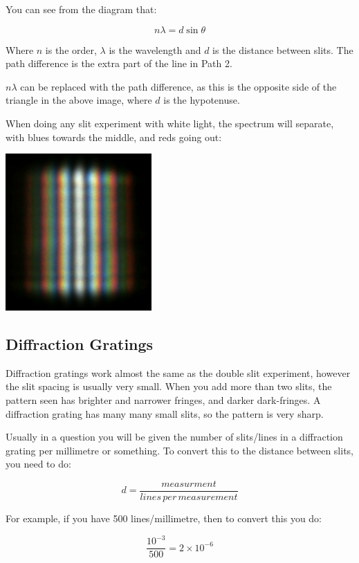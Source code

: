 \documentclass[a4paper, 12pt]{article}
\begin{document}
You can see from the diagram that:

$$
n\lambda = d\sin\theta
$$

Where $n$ is the order, $\lambda$ is the wavelength and $d$ is the distance between slits. The path difference is the extra part of the line in Path 2.

$n{\lambda}$ can be replaced with the path difference, as this is the opposite side of the triangle in the above image, where $d$ is the hypotenuse.

When doing any slit experiment with white light, the spectrum will separate, with blues towards the middle, and reds going out:

\begin{center}
\includegraphics[height=6cm]{images/doubleSlitWhite.png}
\end{center}

\subsection{Diffraction Gratings}

Diffraction gratings work almost the same as the double slit experiment, however the slit spacing is usually very small. When you add more than two slits, the pattern seen has brighter and narrower fringes, and darker dark-fringes. A diffraction grating has many many small slits, so the pattern is very sharp.

Usually in a question you will be given the number of slits/lines in a diffraction grating per millimetre or something. To convert this to the distance between slits, you need to do:

$$
d = \frac{measurment}{lines \, per \, measurement}
$$

For example, if you have 500 lines/millimetre, then to convert this you do:

$$
\frac{10^{-3}}{500} = 2 \times 10^{-6}
$$
\end{document}
